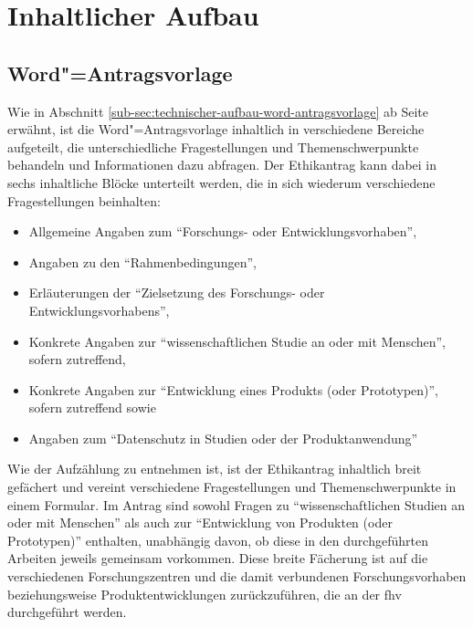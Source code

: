 \documentclass[a4paper,12pt,twoside]{scrreprt}
\begin{document}
\section{Inhaltlicher Aufbau}
\label{sec:inhaltlicher-aufbau}

\subsection{Word"=Antragsvorlage}
\label{sub-sec:inhaltlicher-aufbau-word-antragsvorlage}

Wie in Abschnitt \ref{sub-sec:technischer-aufbau-word-antragsvorlage} ab Seite \pageref{sub-sec:technischer-aufbau-word-antragsvorlage} erwähnt, ist die Word"=Antragsvorlage inhaltlich in verschiedene Bereiche aufgeteilt, die unterschiedliche Fragestellungen und Themenschwerpunkte behandeln und Informationen dazu abfragen. Der Ethikantrag kann dabei in sechs inhaltliche Blöcke unterteilt werden, die in sich wiederum verschiedene Fragestellungen beinhalten:
\begin{itemize}
    \item Allgemeine Angaben zum \enquote{Forschungs- oder Entwicklungsvorhaben},
    \item Angaben zu den \enquote{Rahmenbedingungen},
    \item Erläuterungen der \enquote{Zielsetzung des Forschungs- oder Entwicklungsvorhabens},
    \item Konkrete Angaben zur \enquote{wissenschaftlichen Studie an oder mit Menschen}, sofern zutreffend,
    \item Konkrete Angaben zur \enquote{Entwicklung eines Produkts (oder Prototypen)}, sofern zutreffend sowie
    \item Angaben zum \enquote{Datenschutz in Studien oder der Produktanwendung}
\end{itemize}

Wie der Aufzählung zu entnehmen ist, ist der Ethikantrag inhaltlich breit gefächert und vereint verschiedene Fragestellungen und Themenschwerpunkte in einem Formular. Im Antrag sind sowohl Fragen zu \enquote{wissenschaftlichen Studien an oder mit Menschen} als auch zur \enquote{Entwicklung von Produkten (oder Prototypen)} enthalten, unabhängig davon, ob diese in den durchgeführten Arbeiten jeweils gemeinsam vorkommen. Diese breite Fächerung ist auf die verschiedenen Forschungszentren und die damit verbundenen Forschungsvorhaben beziehungsweise Produktentwicklungen zurückzuführen, die an der \acl{fhv} durchgeführt werden.
\end{document}
